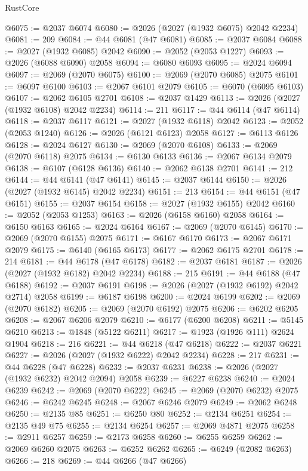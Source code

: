 \begin{lexlean}{RustCore}
\begin{coremodule}
@6075 := @2037 @6074
@6080 := @2026 (@2027 (@1932 @6075) @2042 @2234)
@6081 := 209
@6084 := @44 @6081 (@47 @6081)
@6085 := @2037 @6084
@6088 := @2027 (@1932 @6085) @2042
@6090 := @2052 (@2053 @1227)
@6093 := @2026 (@6088 @6090) @2058
@6094 := @6080 @6093
@6095 := @2024 @6094
@6097 := @2069 (@2070 @6075)
@6100 := @2069 (@2070 @6085) @2075
@6101 := @6097 @6100
@6103 := @2067 @6101 @2079
@6105 := @6070 (@6095 @6103)
@6107 := @2062 @6105 @2701
@6108 := @2037 @1429
@6113 := @2026 (@2027 (@1932 @6108) @2042 @2234)
@6114 := 211
@6117 := @44 @6114 (@47 @6114)
@6118 := @2037 @6117
@6121 := @2027 (@1932 @6118) @2042
@6123 := @2052 (@2053 @1240)
@6126 := @2026 (@6121 @6123) @2058
@6127 := @6113 @6126
@6128 := @2024 @6127
@6130 := @2069 (@2070 @6108)
@6133 := @2069 (@2070 @6118) @2075
@6134 := @6130 @6133
@6136 := @2067 @6134 @2079
@6138 := @6107 (@6128 @6136)
@6140 := @2062 @6138 @2701
@6141 := 212
@6144 := @44 @6141 (@47 @6141)
@6145 := @2037 @6144
@6150 := @2026 (@2027 (@1932 @6145) @2042 @2234)
@6151 := 213
@6154 := @44 @6151 (@47 @6151)
@6155 := @2037 @6154
@6158 := @2027 (@1932 @6155) @2042
@6160 := @2052 (@2053 @1253)
@6163 := @2026 (@6158 @6160) @2058
@6164 := @6150 @6163
@6165 := @2024 @6164
@6167 := @2069 (@2070 @6145)
@6170 := @2069 (@2070 @6155) @2075
@6171 := @6167 @6170
@6173 := @2067 @6171 @2079
@6175 := @6140 (@6165 @6173)
@6177 := @2062 @6175 @2701
@6178 := 214
@6181 := @44 @6178 (@47 @6178)
@6182 := @2037 @6181
@6187 := @2026 (@2027 (@1932 @6182) @2042 @2234)
@6188 := 215
@6191 := @44 @6188 (@47 @6188)
@6192 := @2037 @6191
@6198 := @2026 (@2027 (@1932 @6192) @2042 @2714) @2058
@6199 := @6187 @6198
@6200 := @2024 @6199
@6202 := @2069 (@2070 @6182)
@6205 := @2069 (@2070 @6192) @2075
@6206 := @6202 @6205
@6208 := @2067 @6206 @2079
@6210 := @6177 (@6200 @6208)
@6211 := @5145 @6210
@6213 := @1848 (@5122 @6211)
@6217 := @1923 (@1926 @111) @2624 @1904
@6218 := 216
@6221 := @44 @6218 (@47 @6218)
@6222 := @2037 @6221
@6227 := @2026 (@2027 (@1932 @6222) @2042 @2234)
@6228 := 217
@6231 := @44 @6228 (@47 @6228)
@6232 := @2037 @6231
@6238 := @2026 (@2027 (@1932 @6232) @2042 @2094) @2058
@6239 := @6227 @6238
@6240 := @2024 @6239
@6242 := @2069 (@2070 @6222)
@6245 := @2069 (@2070 @6232) @2075
@6246 := @6242 @6245
@6248 := @2067 @6246 @2079
@6249 := @2062 @6248
@6250 := @2135 @85
@6251 := @6250 @80
@6252 := @2134 @6251
@6254 := @2135 @49 @75
@6255 := @2134 @6254
@6257 := @2069 @4871 @2075
@6258 := @2911 @6257
@6259 := @2173 @6258
@6260 := @6255 @6259
@6262 := @2069 @6260 @2075
@6263 := @6252 @6262
@6265 := @6249 (@2082 @6263)
@6266 := 218
@6269 := @44 @6266 (@47 @6266)

\end{coremodule}
\end{lexlean}
